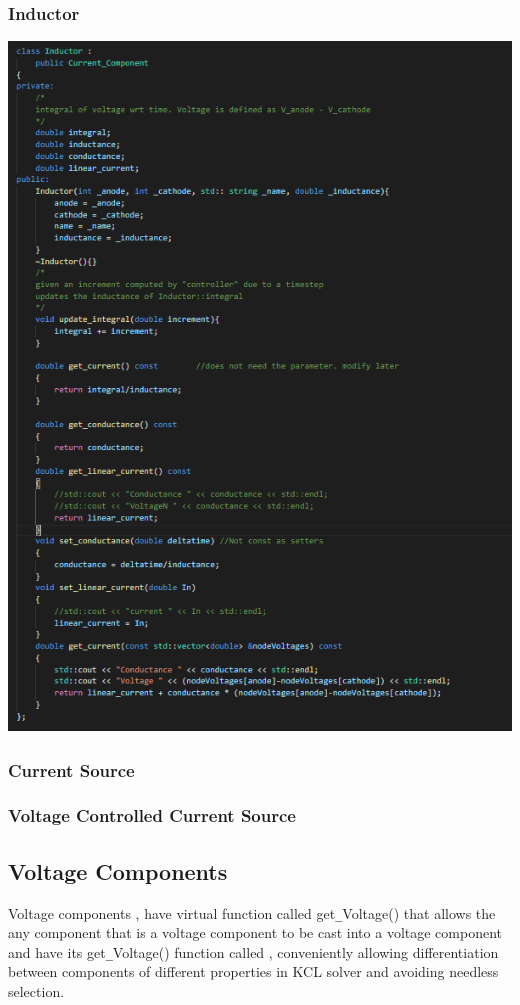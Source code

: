 \documentclass{article}
\begin{document}
\subsubsection{Inductor}
\includegraphics[width=15cm]{images/INDUCTOR.PNG}
\subsubsection{Current Source}
\subsubsection{Voltage Controlled Current Source}

\subsection{Voltage Components}
Voltage components , have virtual function called get\verb|_|Voltage() that allows the any component that is a voltage component to be cast into a voltage component and have its get\verb|_|Voltage() function called , conveniently allowing differentiation between components of different properties in KCL solver and avoiding needless selection.
\medbreak
\end{document}
